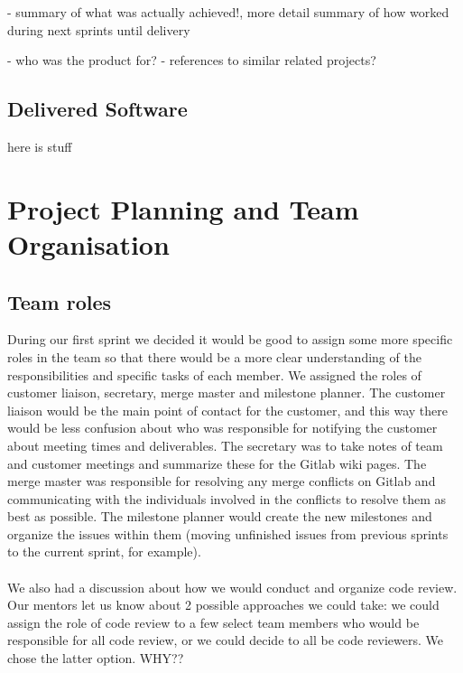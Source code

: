 \documentclass{l3proj}
\begin{document}
- summary of what was actually achieved!, more detail
summary of how worked during next sprints until delivery

- who was the product for?
- references to similar related projects?


\subsection*{Delivered Software}


here is stuff

\section{Project Planning and Team Organisation}
\label{sec:planning}


\subsection*{Team roles}
During our first sprint we decided it would be good to assign some more specific roles in the team so that there would be a more clear understanding of the responsibilities and specific tasks of each member. We assigned the roles of customer liaison, secretary, merge master and milestone planner. The customer liaison would be the main point of contact for the customer, and this way there would be less confusion about who was responsible for notifying the customer about meeting times and deliverables. The secretary was to take notes of team and customer meetings and summarize these for the Gitlab wiki pages. The merge master was responsible for resolving any merge conflicts on Gitlab and communicating with the individuals involved in the conflicts to resolve them as best as possible. The milestone planner would create the new milestones and organize the issues within them (moving unfinished issues from previous sprints to the current sprint, for example).
\\\\
We also had a discussion about how we would conduct and organize code review. Our mentors let us know about 2 possible approaches we could take: we could assign the role of code review to a few select team members who would be responsible for all code review, or we could decide to all be code reviewers. We chose the latter option.
WHY??
\end{document}
